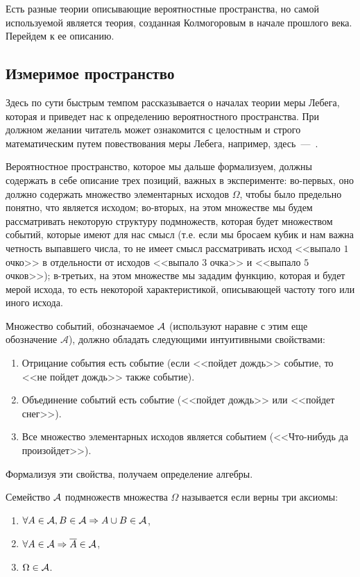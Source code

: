 \documentclass[../TV&MS.tex]{subfiles}
\begin{document}
Есть разные теории описывающие вероятностные пространства, но самой используемой является 
теория, созданная Колмогоровым в начале прошлого века. Перейдем к ее описанию.

\subsection{Измеримое пространство}
	
\qquad Здесь по сути быстрым темпом рассказывается о началах теории меры Лебега,
которая и приведет нас к определению вероятностного пространства. При 
должном желании читатель может ознакомится с целостным и строго математическим
путем повествования меры Лебега, например, здесь~---~\cite{Gusev}.

Вероятностное пространство, которое мы дальше формализуем, должны 
содержать в себе описание трех позиций, важных в эксперименте: 
во-первых, оно должно содержать множество элементарных исходов $\Omega$,
чтобы было предельно понятно, что является исходом; во-вторых,
на этом множестве мы будем рассматривать некоторую структуру подмножеств,
которая будет множеством событий, которые имеют для нас смысл (т.е.
если мы бросаем кубик и нам важна четность выпавшего числа, то не имеет
смысл рассматривать исход <<выпало $1$ очко>> в отдельности от исходов 
<<выпало $3$ очка>> и <<выпало $5$ очков>>); в-третьих, на этом множестве мы 
зададим функцию, которая и будет мерой исхода, то есть некоторой 
характеристикой, описывающей частоту того или иного исхода.


Множество событий, обозначаемое $\mathcal{A}$ (используют наравне с этим еще обозначение 
$\mathscr{A}$), должно обладать следующими интуитивными свойствами:
\begin{enumerate}
	\item Отрицание события есть событие (если <<пойдет дождь>> событие, 
	то <<не пойдет дождь>> также событие).
	\item Объединение событий есть событие (<<пойдет дождь>> или <<пойдет снег>>).
	\item Все множество элементарных исходов является событием (<<Что-нибудь да произойдет>>).
\end{enumerate}

Формализуя эти свойства, получаем определение алгебры.
\begin{Def}
	Семейство $\mathcal{A}$ подмножеств множества $\Omega$  называется  если 
	верны три аксиомы:
\begin{enumerate}[label=(\roman*)]
	\item $\forall A \in \mathcal{A}, B\in \mathcal{A} \Rightarrow A \cup B \in \mathcal{A}$,
	\item $\forall A \in \mathcal{A} \Rightarrow \overline{A} \in \mathcal{A}$,
	\item $\Omega \in \mathcal{A}$.
\end{enumerate}\smallskip
\end{Def}
\end{document}
